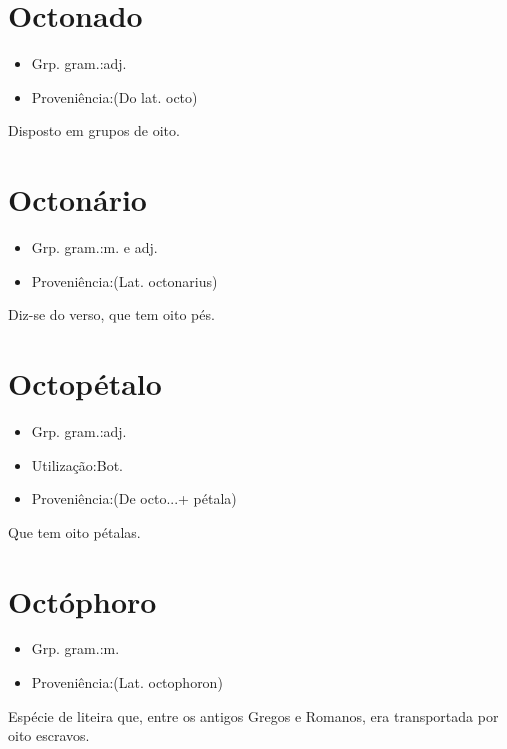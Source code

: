 \section{Octonado}
\begin{itemize}
\item {Grp. gram.:adj.}
\end{itemize}
\begin{itemize}
\item {Proveniência:(Do lat. \textunderscore octo\textunderscore )}
\end{itemize}
Disposto em grupos de oito.
\section{Octonário}
\begin{itemize}
\item {Grp. gram.:m.  e  adj.}
\end{itemize}
\begin{itemize}
\item {Proveniência:(Lat. \textunderscore octonarius\textunderscore )}
\end{itemize}
Diz-se do verso, que tem oito pés.
\section{Octopétalo}
\begin{itemize}
\item {Grp. gram.:adj.}
\end{itemize}
\begin{itemize}
\item {Utilização:Bot.}
\end{itemize}
\begin{itemize}
\item {Proveniência:(De \textunderscore octo...\textunderscore  + \textunderscore pétala\textunderscore )}
\end{itemize}
Que tem oito pétalas.
\section{Octóphoro}
\begin{itemize}
\item {Grp. gram.:m.}
\end{itemize}
\begin{itemize}
\item {Proveniência:(Lat. \textunderscore octophoron\textunderscore )}
\end{itemize}
Espécie de liteira que, entre os antigos Gregos e Romanos, era transportada por oito escravos.
